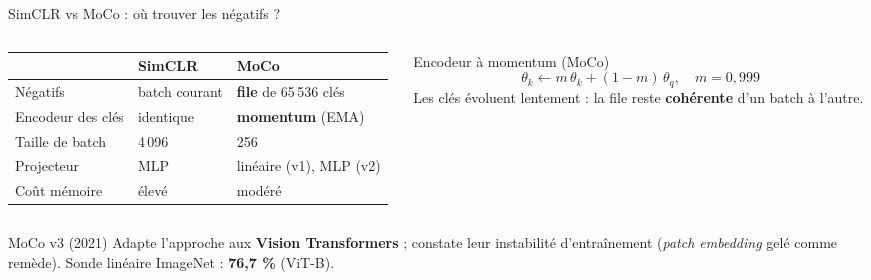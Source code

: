 \documentclass[aspectratio=169,10pt]{beamer}
\newcommand{\src}[1]{\par\vfill\hfill{\tiny\color{grisE}#1}}
\begin{document}
\begin{frame}{SimCLR vs MoCo : où trouver les négatifs ?}
  \begin{columns}[c]
    \begin{column}{0.56\textwidth}
      \footnotesize
      \begin{tabular}{@{}l l l@{}}
        \toprule
         & \textbf{SimCLR} & \textbf{MoCo}\\
        \midrule
        Négatifs & batch courant & \textbf{file} de 65\,536 clés\\
        Encodeur des clés & identique & \textbf{momentum} (EMA)\\
        Taille de batch & 4\,096 & 256\\
        Projecteur & MLP & linéaire (v1), MLP (v2)\\
        Coût mémoire & élevé & modéré\\
        \bottomrule
      \end{tabular}
    \end{column}
    \begin{column}{0.4\textwidth}
      \begin{block}{Encodeur à momentum (MoCo)}
        \small
        \[ \theta_k \leftarrow m\,\theta_k + (1-m)\,\theta_q, \quad m = 0{,}999 \]
        Les clés évoluent lentement : la file reste \textbf{cohérente} d'un batch à l'autre.
      \end{block}
    \end{column}
  \end{columns}
  \vspace{4mm}
  \begin{exampleblock}{MoCo v3 (2021)}
    \small Adapte l'approche aux \textbf{Vision Transformers} ; constate leur instabilité d'entraînement (\textit{patch embedding} gelé comme remède). Sonde linéaire ImageNet : \textbf{76,7 \%} (ViT-B).
  \end{exampleblock}
  \src{\citet{he2020moco,chen2021mocov3}}
\end{frame}
\end{document}
